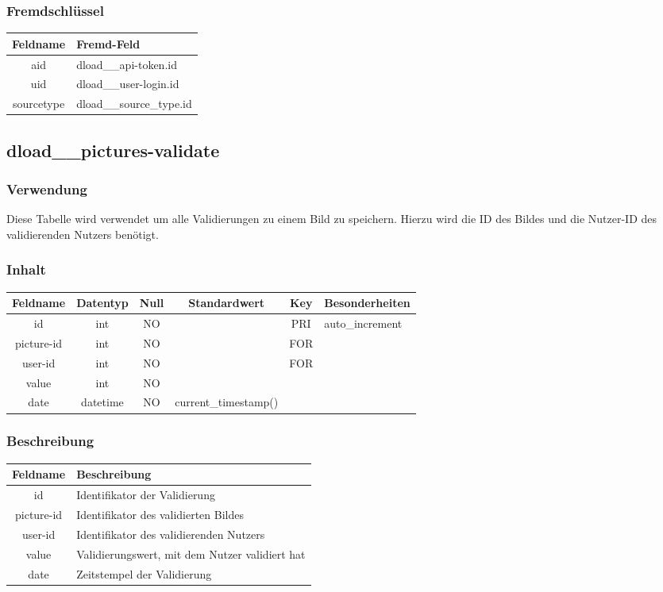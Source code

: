 \subsubsection{Fremdschlüssel}
\begin{table}[H]
	\begin{tabular}{|c|p{12.5cm}|}
		\hline
		\textbf{Feldname} & \textbf{Fremd-Feld} \\ \hline
		aid & dload\_\_api-token.id \\ \hline
		uid & dload\_\_user-login.id \\ \hline
		sourcetype & dload\_\_source\_type.id \\ \hline
	\end{tabular}
\end{table}
\subsection{dload\_\_pictures-validate}
\subsubsection{Verwendung} Diese Tabelle wird verwendet um alle Validierungen zu einem Bild zu speichern. Hierzu wird die ID des Bildes und die Nutzer-ID des validierenden Nutzers benötigt.
\subsubsection{Inhalt}
\begin{table}[H]
	\begin{tabular}{|c|c|c|c|c|p{3.5cm}|}
		\hline
		\textbf{Feldname} & \textbf{Datentyp} & \textbf{Null} & \textbf{Standardwert} & \textbf{Key}   & \textbf{Besonderheiten} \\ \hline
		id & int & NO &  & PRI & auto\_increment \\ \hline
		picture-id & int & NO &  & FOR & \\ \hline
		user-id & int & NO &  & FOR & \\ \hline
		value & int & NO &  &  & \\ \hline
		date & datetime & NO & current\_timestamp() &  & \\ \hline
	\end{tabular}
\end{table}
\subsubsection{Beschreibung}
\begin{table}[H]
	\begin{tabular}{|c|p{12cm}|}
		\hline
		\textbf{Feldname} & \textbf{Beschreibung} \\ \hline
		id & Identifikator der Validierung \\ \hline
		picture-id & Identifikator des validierten Bildes \\ \hline
		user-id & Identifikator des validierenden Nutzers \\ \hline
		value & Validierungswert, mit dem Nutzer validiert hat \\ \hline
		date & Zeitstempel der Validierung \\ \hline
	\end{tabular}
\end{table}
